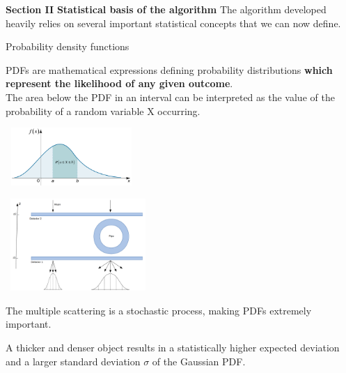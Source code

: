 \documentclass[handout,8 pt]{beamer}
\begin{document}
\begin{frame}{}
\centering
	\huge{\textbf{\color{mycolor} Section II}} \newline
	\LARGE{\textbf{\color{mycolor} Statistical basis of the algorithm \color{black}}} \vfill
\Large{The algorithm developed heavily relies on several important statistical concepts that we can now define.} \vfill
\end{frame}

\begin{frame}{Probability density functions}

\begin{minipage}[c]{.50\textwidth}
\justifying
PDFs are mathematical expressions defining probability distributions \textbf{which represent the likelihood of any given outcome}. \\ \vspace{10pt}
The area below the PDF in an interval can be interpreted as the value of the probability of a random variable X occurring. 
\end{minipage}
\begin{minipage}[c]{.50\textwidth}
\begin{center}
\includegraphics[width=5cm, height=2.2cm]{figs/PDF.png}
\end{center}
\end{minipage} \vfill

\begin{minipage}[c]{.50\textwidth}
\includegraphics[width=5.5cm, height=3.5cm]{figs/setup.png}
\end{minipage}
\begin{minipage}[c]{.50\textwidth}
\justifying
The multiple scattering is a stochastic process, making PDFs extremely important. 

\begin{exampleblock}{}
\justifying A thicker and denser object results in a statistically higher expected deviation and a larger standard deviation $\sigma$ of the Gaussian PDF. \end{exampleblock}

\end{minipage}
\end{frame}
\end{document}
